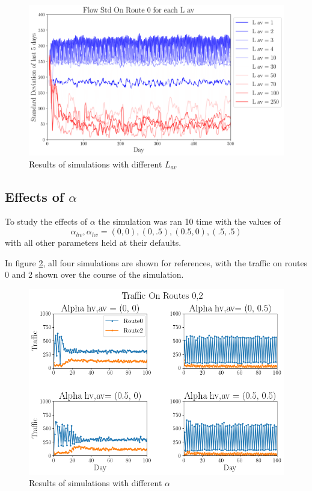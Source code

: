 \documentclass[12pt, a4paper, onecolumn]{article}
\begin{document}
\begin{figure}[h!]
	\centering
	\includegraphics[scale=.5]{av_l_std.png}
	\caption{Results of simulations with different $L_{av}$}
	\label{fig:avlstd}
	\end{figure}

\subsection{Effects of $\alpha$}
To study the effects of $\alpha$ the simulation was ran 10 time with the values of
$$ \alpha_{hv},\alpha_{hv} = (0,0) , (0,.5) ,(0.5,0), (.5,.5) $$
with all other parameters held at their defaults.

In figure \ref{fig:atisgrid}, all four simulations are shown for references, with the traffic on routes 0 and 2 shown over the course of the simulation.

\begin{figure}[h!]
	\centering
	\includegraphics[scale=.5]{atis_grid.png}
	\caption{Results of simulations with different $\alpha$}
	\label{fig:atisgrid}
	\end{figure}
\end{document}
